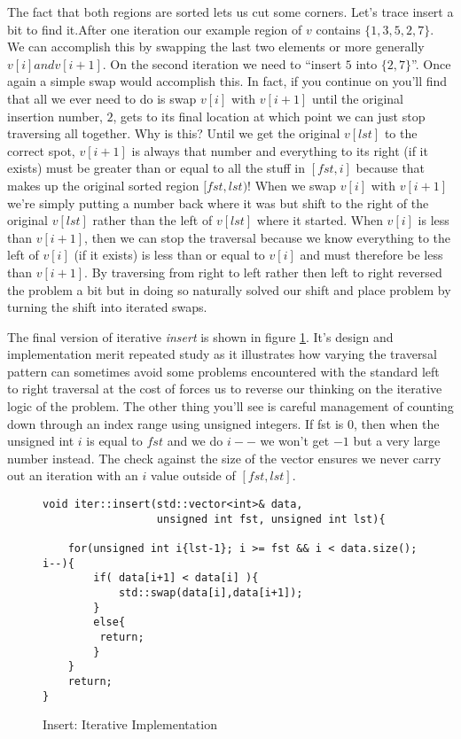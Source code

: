 \documentclass[]{tufte-handout}
\begin{document}
The fact that both regions are sorted lets us cut some corners. Let's trace insert a bit to find it.After one iteration our example region of $v$ contains $\{1,3,5,2,7\}$. We can accomplish this by swapping the last two elements or more generally $v[i] and v[i+1]$. On the second iteration we need to ``insert $5$ into $\{2,7\}$''.  Once again a simple swap would accomplish this. In fact, if you continue on you'll find that all we ever need to do is swap $v[i]$ with $v[i+1]$ until the original insertion number, $2$, gets to its final location at which point we can just stop traversing all together. Why is this?  Until we get the original $v[lst]$ to the correct spot, $v[i+1]$ is always that number and everything to its right (if it exists) must be greater than or equal to all the stuff in $[fst,i]$ because that makes up the original sorted region $[fst,lst)$! When we swap $v[i]$ with $v[i+1]$ we're simply putting a number back where it was but shift to the right of the original $v[lst]$ rather than the left of $v[lst]$ where it started. When $v[i]$ is less than $v[i+1]$, then we can stop the traversal because we know everything to the left of $v[i]$ (if it exists) is less than or equal to $v[i]$ and must therefore be less than $v[i+1]$. By traversing from right to left rather then left to right reversed the problem a bit but in doing so naturally solved our shift and place problem by turning the shift into iterated swaps.

The final version of iterative \textit{insert} is shown in figure \ref{code:insertiter}. It's design and implementation merit repeated study as it illustrates how varying the traversal pattern can sometimes avoid some problems encountered with the standard left to right traversal at the cost of forces us to reverse our thinking on the iterative logic of the problem. The other thing you'll see is careful management of counting down through an index range using unsigned integers. If fst is $0$, then when the unsigned int $i$ is equal to $fst$ and we do $i--$ we won't get $-1$ but a very large number instead. The check against the size of the vector ensures we never carry out an iteration with an $i$ value outside of $[fst,lst]$.
\begin{figure}[htpb!]
\begin{lstlisting}
void iter::insert(std::vector<int>& data,
	    		  unsigned int fst, unsigned int lst){

	for(unsigned int i{lst-1}; i >= fst && i < data.size(); i--){
    	if( data[i+1] < data[i] ){
			std::swap(data[i],data[i+1]);
      	}
      	else{
		 return;
        }
    }
    return;
}
\end{lstlisting}
\label{code:insertiter}
\caption{Insert: Iterative Implementation}
\end{figure}
\end{document}
